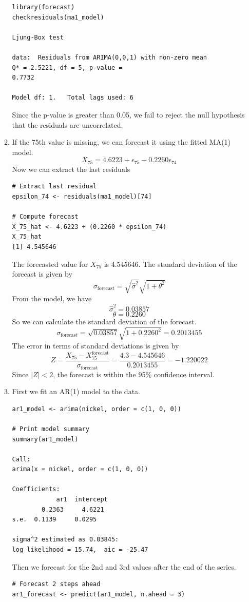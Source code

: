 \documentclass[12pt]{article}
\begin{document}
\begin{enumerate}
\begin{enumerate}
\begin{verbatim}
library(forecast)
checkresiduals(ma1_model)

Ljung-Box test

data:  Residuals from ARIMA(0,0,1) with non-zero mean
Q* = 2.5221, df = 5, p-value =
0.7732

Model df: 1.   Total lags used: 6
\end{verbatim}
    Since the p-value is greater than 0.05, we fail to reject the null hypothesis that the residuals are uncorrelated.
    \item If the 75th value is missing, we can forecast it using the fitted
    MA(1) model.
    \[
        X_{75} = 4.6223 + \epsilon_{75} + 0.2260 \epsilon_{74}
    \]
    Now we can extract the last residuals
\begin{verbatim}
# Extract last residual
epsilon_74 <- residuals(ma1_model)[74]

# Compute forecast
X_75_hat <- 4.6223 + (0.2260 * epsilon_74)
X_75_hat
[1] 4.545646
\end{verbatim}
    The forecasted value for $X_{75}$ is 4.545646.
    The standard deviation of the forecast is given by
    \[
        \sigma_{\text{forecast}} = \sqrt{\hat{\sigma}^2} \sqrt{1 + \theta^2}
    \]
    From the model, we have 
    \[
        \hat{\sigma}^2 = 0.03857
    \]
    \[
        \theta = 0.2260
    \]
    So we can calculate the standard deviation of the forecast.
    \[
        \sigma_{\text{forecast}} = \sqrt{0.03857} \sqrt{1 + 0.2260^2} = 0.2013455
    \]
    The error in terms of standard deviations is given by
    \[
        Z = \frac{X_{75} - X_{75}^{\text{forecast}}}{\sigma_{\text{forecast}}}
        = \frac{4.3 - 4.545646}{0.2013455} = -1.220022
    \]
    Since $|Z| < 2$, the forecast is within the 95\% confidence interval.

    \item First we fit an AR(1) model to the data.
\begin{verbatim}
ar1_model <- arima(nickel, order = c(1, 0, 0))

# Print model summary
summary(ar1_model)

Call:
arima(x = nickel, order = c(1, 0, 0))

Coefficients:
            ar1  intercept
        0.2363     4.6221
s.e.  0.1139     0.0295

sigma^2 estimated as 0.03845:  
log likelihood = 15.74,  aic = -25.47
\end{verbatim}
    Then we forecast for the 2nd and 3rd values after the end of
    the series.
\begin{verbatim}
# Forecast 2 steps ahead
ar1_forecast <- predict(ar1_model, n.ahead = 3)


\end{verbatim}
\end{enumerate}
\end{enumerate}
\end{document}
